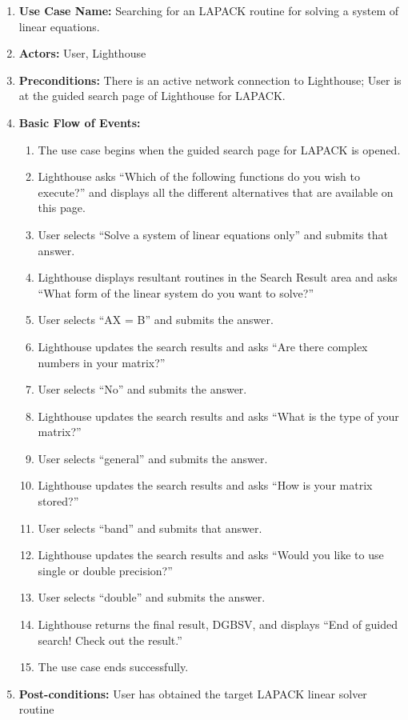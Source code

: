\documentclass{sig-alternate}
\newcommand{\zapspace}{\topsep=0pt\partopsep=0pt\itemsep=0pt\parskip=0pt}
\begin{document}
\begin{enumerate}\zapspace
\item \textbf{Use Case Name:} Searching for an LAPACK routine for solving a system of linear equations.
\item \textbf{Actors:} User, Lighthouse
\item \textbf{Preconditions:} There is an active network connection to Lighthouse; User is at the guided search page of Lighthouse for LAPACK.
\item \textbf{Basic Flow of Events:}
    \begin{enumerate}
        \item The use case begins when the guided search page for LAPACK is opened.
        \item Lighthouse asks ``Which of the following functions do you wish to execute?'' and displays all the different alternatives that
        are available on this page.
        \item User selects ``Solve a system of linear equations only'' and submits that answer.
        \item Lighthouse displays resultant routines in the Search Result area and asks ``What form of the linear system do you want to solve?''
        \item User selects ``AX = B'' and submits the answer.
        \item Lighthouse updates the search results and asks ``Are there complex numbers in your matrix?''
        \item User selects ``No'' and submits the answer.
        \item Lighthouse updates the search results and asks ``What is the type of your matrix?''
        \item User selects ``general'' and submits the answer.
        \item Lighthouse updates the search results and asks ``How is your matrix stored?''
        \item User selects ``band'' and submits that answer.
        \item Lighthouse updates the search results and asks ``Would you like to use single or double precision?''
        \item User selects ``double'' and submits the answer.
        \item Lighthouse returns the final result, DGBSV, and displays ``End of guided search! Check out the result.''
        \item The use case ends successfully.
    \end{enumerate}
\item \textbf{Post-conditions:} User has obtained the target LAPACK linear solver routine  
\end{enumerate}
\end{document}
